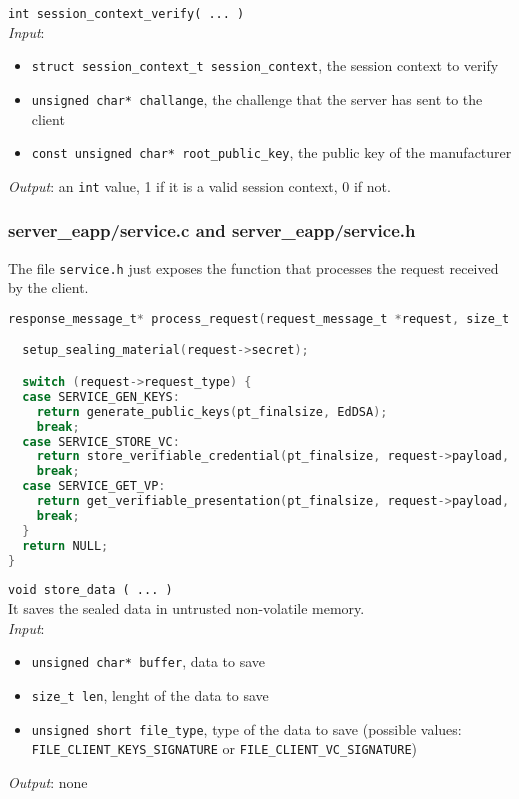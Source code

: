 \noindent
\texttt{int session\_context\_verify( ... )}\\
\textit{Input}:
\begin{itemize}[noitemsep,nolistsep]
  \item \texttt{struct session\_context\_t session\_context}, the session context to verify
  \item \texttt{unsigned char* challange}, the challenge that the server has sent to the client
  \item \texttt{const unsigned char* root\_public\_key}, the public key of the manufacturer
\end{itemize}
\textit{Output}: an \texttt{int} value, 1 if it is a valid session context, 0 if not.

\subsubsection{server\_eapp/service.c and server\_eapp/service.h}
The file \texttt{service.h} just exposes the function that processes the request received by the client.  
\begin{lstlisting}[language=C,frame=single]
response_message_t* process_request(request_message_t *request, size_t *pt_finalsize) {

  setup_sealing_material(request->secret);

  switch (request->request_type) {
  case SERVICE_GEN_KEYS:
    return generate_public_keys(pt_finalsize, EdDSA);
    break;
  case SERVICE_STORE_VC:
    return store_verifiable_credential(pt_finalsize, request->payload, request->len);
    break;
  case SERVICE_GET_VP:
    return get_verifiable_presentation(pt_finalsize, request->payload, request->len, EdDSA);
    break;
  }
  return NULL;
}
\end{lstlisting}

\noindent
\texttt{void store\_data ( ... )}\\
It saves the sealed data in untrusted non-volatile memory. \\
\textit{Input}:
\begin{itemize}[noitemsep,nolistsep]
  \item \texttt{unsigned char* buffer}, data to save
  \item \texttt{size\_t len}, lenght of the data to save
  \item \texttt{unsigned short file\_type}, type of the data to save (possible values: \texttt{FILE\_CLI\-ENT\_KEYS\_SIGNATURE} or \texttt{FILE\_CLIENT\_VC\_SIGNATURE})
\end{itemize}
\textit{Output}: none

